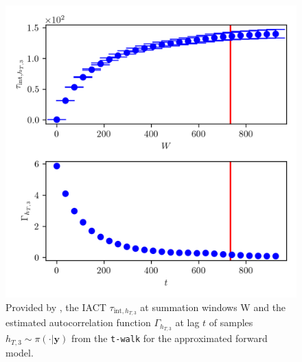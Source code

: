\begin{figure}[ht!]
	\centering
	\includegraphics{UwerrTauIntTWalk6.png}
	\caption[IACT and autocorrelation function of samples $h_{T,3} \sim \pi(\cdot|\bm{y})$, for approximated model.]{Provided by \cite{drikHesse}, the IACT $\tau_{\text{int},h_{T,3}}$ at summation windows W and the estimated autocorrelation function $\Gamma_{h_{T,3}}$ at lag $t$ of samples $h_{T,3} \sim \pi( \cdot| \bm{y})$ from the \texttt{t-walk} for the approximated forward model.}
	\label{fig:TWalkIATC7}
\end{figure}

